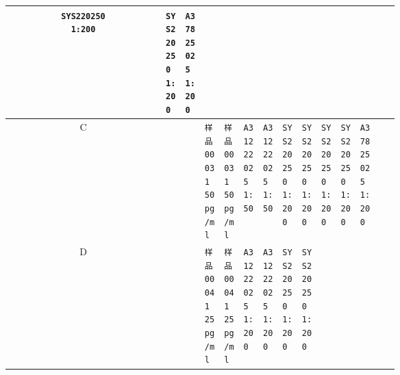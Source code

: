 \documentclass[UTF8,10pt,a4paper,fontset=fandol]{ctexart}
\newcommand{\fieldvalue}[1]{#1}
\begin{document}
\begin{center}
\begin{tabular}{c|*{12}{p{0.055\linewidth}|}}
\fieldvalue{\texttt{SYS220250\\1:200}} &
\fieldvalue{\texttt{SYS220250\\1:200}} &
\fieldvalue{\texttt{A37825025\\1:200}} &
\\ \hline
C &
&
&
\fieldvalue{\texttt{样品0003\\1\\50 pg/ml}} &
\fieldvalue{\texttt{样品0003\\1\\50 pg/ml}} &
\fieldvalue{\texttt{A31222025\\1:50}} &
\fieldvalue{\texttt{A31222025\\1:50}} &
\fieldvalue{\texttt{SYS220250\\1:200}} &
\fieldvalue{\texttt{SYS220250\\1:200}} &
\fieldvalue{\texttt{SYS220250\\1:200}} &
\fieldvalue{\texttt{SYS220250\\1:200}} &
\fieldvalue{\texttt{A37825025\\1:200}} &
\\ \hline
D &
&
&
\fieldvalue{\texttt{样品0004\\1\\25 pg/ml}} &
\fieldvalue{\texttt{样品0004\\1\\25 pg/ml}} &
\fieldvalue{\texttt{A31222025\\1:200}} &
\fieldvalue{\texttt{A31222025\\1:200}} &
\fieldvalue{\texttt{SYS220250\\1:200}} &
\fieldvalue{\texttt{SYS220250\\1:200}} &

\end{tabular}
\end{center}
\end{document}
